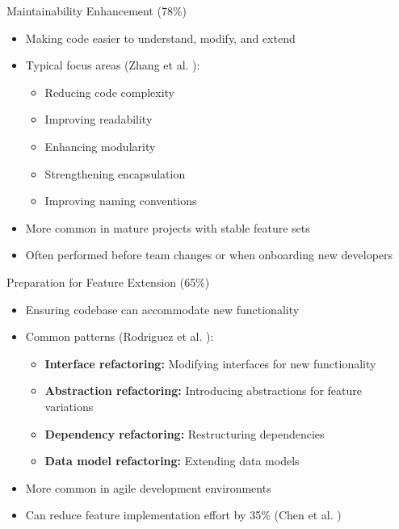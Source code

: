 \documentclass{beamer}
\begin{document}
\begin{frame}{Maintainability Enhancement (78\%)}
    \begin{itemize}
        \item Making code easier to understand, modify, and extend
        \item Typical focus areas (Zhang et al. \cite{zhang2024}):
            \begin{itemize}
                \item Reducing code complexity
                \item Improving readability
                \item Enhancing modularity
                \item Strengthening encapsulation
                \item Improving naming conventions
            \end{itemize}
        \item More common in mature projects with stable feature sets
        \item Often performed before team changes or when onboarding new developers
    \end{itemize}
\end{frame}

\begin{frame}{Preparation for Feature Extension (65\%)}
    \begin{itemize}
        \item Ensuring codebase can accommodate new functionality
        \item Common patterns (Rodriguez et al. \cite{rodriguez2022}):
            \begin{itemize}
                \item \textbf{Interface refactoring:} Modifying interfaces for new functionality
                \item \textbf{Abstraction refactoring:} Introducing abstractions for feature variations
                \item \textbf{Dependency refactoring:} Restructuring dependencies
                \item \textbf{Data model refactoring:} Extending data models
            \end{itemize}
        \item More common in agile development environments
        \item Can reduce feature implementation effort by 35\% (Chen et al. \cite{chen2023})
    \end{itemize}
\end{frame}
\end{document}

